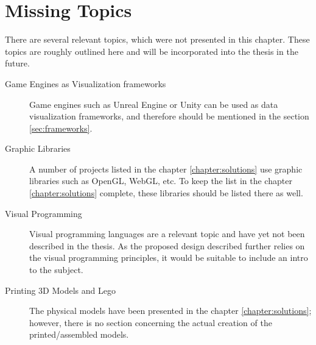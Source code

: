\section{Missing Topics}
There are several relevant topics, which were not presented in this chapter. These topics are roughly outlined here and will be incorporated into the thesis in the future.
\begin{description}
    \item[Game Engines as Visualization frameworks] Game engines such as Unreal Engine or Unity can be used as data visualization frameworks, and therefore should be mentioned in the section \ref{sec:frameworks}.
    \item[Graphic Libraries] A number of projects listed in the chapter \ref{chapter:solutions} use graphic libraries such as OpenGL, WebGL, etc. To keep the list in the chapter \ref{chapter:solutions} complete, these libraries should be listed there as well.
    \item[Visual Programming] Visual programming languages are a relevant topic and have yet not been described in the thesis. As the proposed design described further relies on the visual programming principles, it would be suitable to include an intro to the subject.
    \item[Printing 3D Models and Lego] The physical models have been presented in the chapter \ref{chapter:solutions}; however, there is no section concerning the actual creation of the printed/assembled models.  
\end{description}